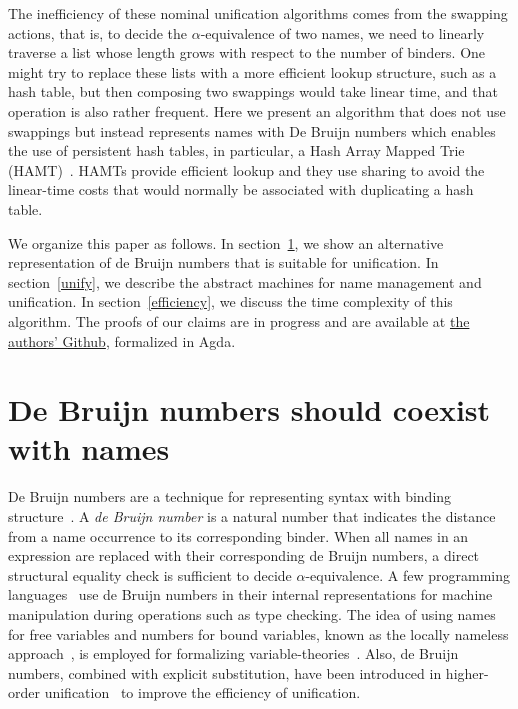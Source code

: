\documentclass[a4paper,UKenglish]{lipics-v2016}
\begin{document}
The inefficiency of these nominal unification algorithms comes from
the swapping actions, that is, to decide the $\alpha$-equivalence of
two names, we need to linearly traverse a list whose length grows with
respect to the number of binders.  One might try to replace these
lists with a more efficient lookup structure, such as a hash table,
but then composing two swappings would take linear time, and that
operation is also rather frequent.  Here we present an algorithm that
does not use swappings but instead represents names with De Bruijn
numbers which enables the use of persistent hash tables, in
particular, a Hash Array Mapped Trie
(HAMT)~\citep{bagwell_ideal_2001}. HAMTs provide efficient lookup and
they use sharing to avoid the linear-time costs that would normally be
associated with duplicating a hash table.

We organize this paper as follows.  In section~\ref{closures}, we show
an alternative representation of de Bruijn numbers that is suitable
for unification.  In section~\ref{unify}, we describe the abstract
machines for name management and unification.  In
section~\ref{efficiency}, we discuss the time complexity of this
algorithm. The proofs of our claims are in progress and are available
at \href{https://github.com/mvcccccc/UNIF2018}{the authors' Github},
formalized in Agda.
  

\section{De Bruijn numbers should coexist with names}
\label{closures}

De Bruijn numbers are a technique for representing syntax with binding
structure~\citep{de_bruijn_lambda_1972}.  A \emph{de Bruijn number} is
a natural number that indicates the distance from a name occurrence to
its corresponding binder.  When all names in an expression are
replaced with their corresponding de Bruijn numbers, a direct
structural equality check is sufficient to decide
$\alpha$-equivalence.  A few programming
languages~\citep{norell_towards_2007} use de Bruijn numbers in their
internal representations for machine manipulation during operations
such as type checking.  The idea of using names for free variables and
numbers for bound variables, known as the locally nameless
approach~\citep{chargueraud_locally_2012}, is employed for formalizing
variable-theories~\citep{aydemir_nominal_2006,
  aydemir_engineering_2008}.  Also, de Bruijn numbers, combined with
explicit substitution, have been introduced in higher-order
unification~\citep{dowek_higher_2000} to improve the efficiency of
unification.
\end{document}
